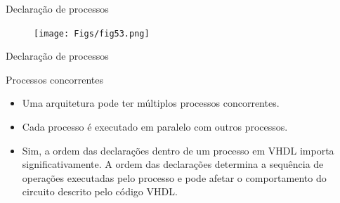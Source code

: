 \documentclass[aspectratio=169]{beamer}
\begin{document}

\begin{frame}{Declaração de processos}
	\justifying
	
	\begin{figure}[h]
		\centering
		\texttt{[image: Figs/fig53.png]}
	\end{figure}
	
	
	
	
\end{frame}
\begin{frame}{Declaração de processos}
	\justifying
	
	
	\begin{block}{Processos concorrentes}
	\begin{itemize}
		\item Uma arquitetura pode ter múltiplos processos concorrentes.
		\item Cada processo é executado em paralelo com outros processos. 
		\item Sim, a ordem das declarações dentro de um processo em VHDL importa significativamente. A ordem das declarações determina a sequência de operações executadas pelo processo e pode afetar o comportamento do circuito descrito pelo código VHDL.
	\end{itemize}
	
	\end{block}		
	
%	
%	
\end{frame}
\end{document}

